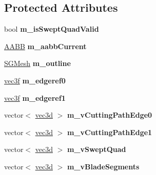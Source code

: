 \subsection*{Protected Attributes}
\begin{DoxyCompactItemize}
\item 
\hypertarget{classAvatarScalpel_ab183020713d09e8b0e67baed8d75aded}{}bool {\bfseries m\+\_\+is\+Swept\+Quad\+Valid}\label{classAvatarScalpel_ab183020713d09e8b0e67baed8d75aded}

\item 
\hypertarget{classAvatarScalpel_a5f27733fcb49766dfcc388a8e025b9ad}{}\hyperlink{classps_1_1base_1_1AABB}{A\+A\+B\+B} {\bfseries m\+\_\+aabb\+Current}\label{classAvatarScalpel_a5f27733fcb49766dfcc388a8e025b9ad}

\item 
\hypertarget{classAvatarScalpel_ac8f29040d2ae50ff36786036400922c2}{}\hyperlink{classps_1_1scene_1_1SGMesh}{S\+G\+Mesh} {\bfseries m\+\_\+outline}\label{classAvatarScalpel_ac8f29040d2ae50ff36786036400922c2}

\item 
\hypertarget{classAvatarScalpel_a9c64ec38e0aa272ea772f5a9042d2651}{}\hyperlink{classps_1_1base_1_1Vec3}{vec3f} {\bfseries m\+\_\+edgeref0}\label{classAvatarScalpel_a9c64ec38e0aa272ea772f5a9042d2651}

\item 
\hypertarget{classAvatarScalpel_a24f4d17de0a5ae36fe44c23259857607}{}\hyperlink{classps_1_1base_1_1Vec3}{vec3f} {\bfseries m\+\_\+edgeref1}\label{classAvatarScalpel_a24f4d17de0a5ae36fe44c23259857607}

\item 
\hypertarget{classAvatarScalpel_ab2b832de2c3c8119c767e883e959b1d8}{}vector$<$ \hyperlink{classps_1_1base_1_1Vec3}{vec3d} $>$ {\bfseries m\+\_\+v\+Cutting\+Path\+Edge0}\label{classAvatarScalpel_ab2b832de2c3c8119c767e883e959b1d8}

\item 
\hypertarget{classAvatarScalpel_a6c56f881a613678c361d9053446bf07f}{}vector$<$ \hyperlink{classps_1_1base_1_1Vec3}{vec3d} $>$ {\bfseries m\+\_\+v\+Cutting\+Path\+Edge1}\label{classAvatarScalpel_a6c56f881a613678c361d9053446bf07f}

\item 
\hypertarget{classAvatarScalpel_a4c8bddc2b8a515228c5219da800639c7}{}vector$<$ \hyperlink{classps_1_1base_1_1Vec3}{vec3d} $>$ {\bfseries m\+\_\+v\+Swept\+Quad}\label{classAvatarScalpel_a4c8bddc2b8a515228c5219da800639c7}

\item 
\hypertarget{classAvatarScalpel_a296ee77b34cf32e352dfab7d92298721}{}vector$<$ \hyperlink{classps_1_1base_1_1Vec3}{vec3d} $>$ {\bfseries m\+\_\+v\+Blade\+Segments}\label{classAvatarScalpel_a296ee77b34cf32e352dfab7d92298721}

\end{DoxyCompactItemize}

